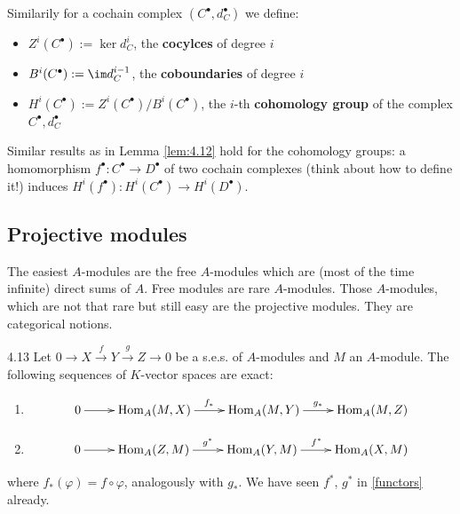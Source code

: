 \documentclass[twoside = false,	%
		headsepline,		%
		parskip = true,
		]{scrbook}						%
\begin{document}
        Similarily for a cochain complex $(C^\bullet,d_C^\bullet)$ we define:
        \begin{itemize}
            \item $Z^i(C^\bullet):= \ker d_C^i$, the \textbf{cocylces} of degree $i$ 
            \item $B^i(C^\bullet):= \im d_C^{i-1}$, the \textbf{coboundaries} of degree $i$
            \item $H^i(C^\bullet):= Z^i(C^\bullet)/B^i(C^\bullet)$, the $i$-th \textbf{cohomology group} of the complex $C^\bullet, d_C^\bullet$
        \end{itemize}

        Similar results as in Lemma \ref{lem:4.12} hold for the cohomology groups: a homomorphism $f^\bullet: C^\bullet \to D^\bullet$ of two cochain complexes (think about how to define it!) induces $H^i(f^\bullet): H^i(C^\bullet) \to H^i(D^\bullet)$.

    \subsection{Projective modules}
        The easiest $A$-modules are the free $A$-modules which are (most of the time infinite) direct sums of $A$. Free modules are rare $A$-modules. Those $A$-modules, which are not that rare but still easy are the projective modules. They are categorical notions.

        \begin{proposition}{}{4.13}
            Let $0 \to X \xrightarrow{f} Y \xrightarrow{g} Z \to 0$ be a s.e.s. of $A$-modules and $M$ an $A$-module. The following sequences of $K$-vector spaces are exact:
            \begin{enumerate}
                \item
                    \begin{equation*}
                    \xymatrix{
                        0 \ar[r] & \Hom_A(M,X) \ar[r]^{f_*} & \Hom_A(M,Y) \ar[r]^{g_*}  & \Hom_A(M,Z)
                    }
                    \end{equation*}
                \item
                    \begin{equation*}
                    \xymatrix {
                        0 \ar[r]& \Hom_A(Z,M) \ar[r]^{g^*} & \Hom_A(Y,M) \ar[r]^{f^*} & \Hom_A(X,M)
                    }
                    \end{equation*}
            \end{enumerate}
            where $f_*(\varphi) = f \circ \varphi$, analogously with $g_*$. We have seen $f^*$, $g^*$ in \ref{functors} already.
        \end{proposition}
\end{document}
